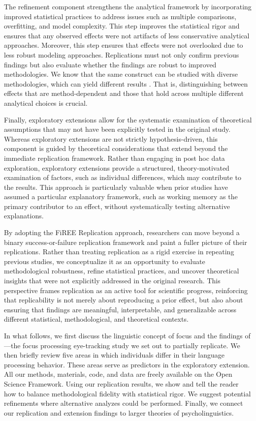 The refinement component strengthens the analytical framework by incorporating improved statistical practices to address issues such as multiple comparisons, overfitting, and model complexity. This step improves the statistical rigor and ensures that any observed effects were not artifacts of less conservative analytical approaches. Moreover, this step ensures that effects were not overlooked due to less robust modeling approaches. Replications must not only confirm previous findings but also evaluate whether the findings are robust to improved methodologies. We know that the same construct can be studied with diverse methodologies, which can yield different results \citep[e.g.,][] {roettger2017methodological}. That is, distinguishing between effects that are method-dependent and those that hold across multiple different analytical choices is crucial.

Finally, exploratory extensions allow for the systematic examination of theoretical assumptions that may not have been explicitly tested in the original study. Whereas exploratory extensions are not strictly hypothesis-driven, this component is guided by theoretical considerations that extend beyond the immediate replication framework. Rather than engaging in post hoc data exploration, exploratory extensions provide a structured, theory-motivated examination of factors, such as individual differences, which may contribute to the results. This approach is particularly valuable when prior studies have assumed a particular explanatory framework, such as working memory as the primary contributor to an effect, without systematically testing alternative explanations.

By adopting the FiREE Replication approach, researchers can move beyond a binary success-or-failure replication framework \citep{Nosek_Errington2020} and paint a fuller picture of their replications. Rather than treating replication as a rigid exercise in repeating previous studies, we conceptualize it as an opportunity to evaluate methodological robustness, refine statistical practices, and uncover theoretical insights that were not explicitly addressed in the original research. This perspective frames replication as an active tool for scientific progress, reinforcing that replicability is not merely about reproducing a prior effect, but also about ensuring that findings are meaningful, interpretable, and generalizable across different statistical, methodological, and theoretical contexts.

In what follows, we first discuss the linguistic concept of focus and the findings of \cite{Ge2021}---the focus processing eye-tracking study we set out to partially replicate. We then briefly review five areas in which individuals differ in their language processing behavior. These areas serve as predictors in the exploratory extension. All our methods, materials, code, and data are freely available on the Open Science Framework. Using our \cite{Ge2021} replication results, we show and tell the reader how to balance methodological fidelity with statistical rigor. We suggest potential refinements where alternative analyzes could be performed. Finally, we connect our replication and extension findings to larger theories of psycholinguistics. 


